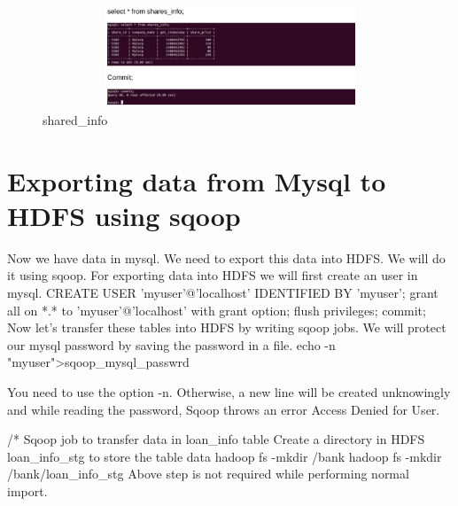 \begin{figure}[H]
\centering
\includegraphics[width=12cm,height=3cm]{sharedinfor.png}
    \caption{shared\_info}
\end{figure}


\section{Exporting data from Mysql to HDFS using sqoop}

Now we have data in mysql. We need to export this data into HDFS. We will do it using sqoop.\newline
For exporting data into HDFS we will first create an user in mysql.\newline
CREATE USER 'myuser'@'localhost' IDENTIFIED BY \newline
'myuser'; grant all on *.* to 'myuser'@'localhost' with grant \newline
option; flush privileges; \newline
commit; \newline    
Now let's transfer these tables into HDFS by writing sqoop jobs.\newline
We will protect our mysql password by saving the password in a file.\newline
echo -n "myuser"\>>sqoop\_mysql\_passwrd\newline

You need to use the option -n. Otherwise, a new line will be created unknowingly and while \newline
reading the password, Sqoop throws an error Access Denied for User.\newline

/* \newline
Sqoop job to transfer data in loan\_info table \newline
Create a directory in HDFS loan\_info\_stg to store the table data \newline
hadoop fs -mkdir /bank \newline
hadoop fs -mkdir /bank/loan\_info\_stg \newline
Above step is not required while performing normal import. \newline
